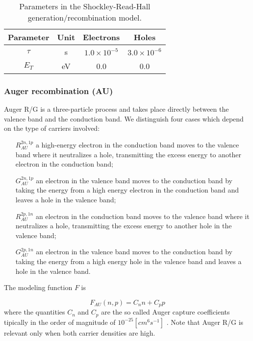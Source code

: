 \begin{table}[!h]
\centering
\begin{tabular}{cccc}
\toprule
Parameter & Unit & Electrons & Holes \\
\midrule
$\tau$ & s & $1.0\times 10^{-5}$ & $3.0 \times 10^{-6}$\\
$E_T$ & eV & 0.0 & 0.0\\
\bottomrule
\end{tabular}
\caption{Parameters in the Shockley-Read-Hall generation/recombination model.}
\end{table}

\subsubsection{Auger recombination (AU)}

Auger R/G is a three-particle process and takes place directly between the valence band and the conduction band. We distinguish four cases which depend on the type of carriers involved:

\begin{itemize}[leftmargin=1.5cm]
\item[$R_{AU}^{2n,1p}$] a high-energy electron in the conduction band moves to the valence band where it neutralizes a hole, transmitting the excess energy to another electron in the conduction band;
\item[$G_{AU}^{2n,1p}$] an electron in the valence band moves to the conduction band by taking the energy from a high energy electron in the conduction band and leaves a hole in the valence band;
\item[$R_{AU}^{2p,1n}$] an electron in the conduction band moves to the valence band where it neutralizes a hole, transmitting the excess energy to another hole in the valence band;
\item[$G_{AU}^{2p,1n}$] an electron in the valence band moves to the conduction band by taking the energy from a high energy hole in the valence band and leaves a hole in the valence band.
\end{itemize}

The modeling function $F$ is

\begin{equation}
F_{AU}(n,p) = C_nn+C_pp
\end{equation}
where the quantities $C_n$ and $C_p$ are the so called  Auger capture coefficients tipically in the order of magnitude of $10^{-25}[cm^6s^{-1}]$ \cite{Lochmann}.
Note that Auger R/G is relevant only when both carrier densities are high.

